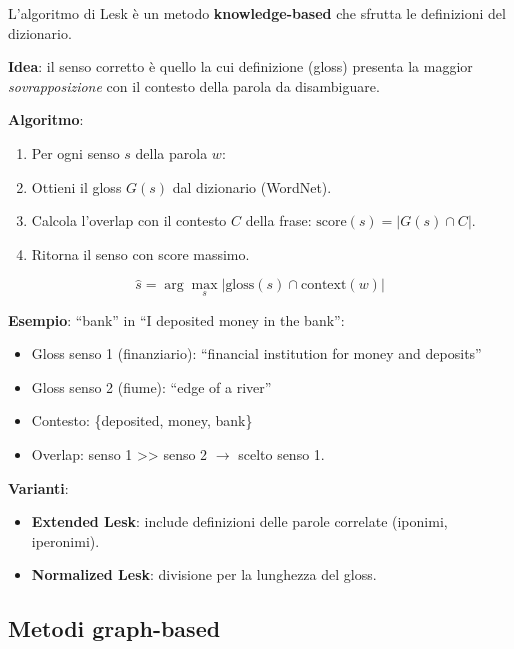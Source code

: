 \documentclass[12pt,a4paper]{article}
\begin{document}
L'algoritmo di Lesk è un metodo \textbf{knowledge-based} che sfrutta le definizioni del dizionario.

\begin{defbox}
\textbf{Idea}: il senso corretto è quello la cui definizione (gloss) presenta la maggior \emph{sovrapposizione} con il contesto della parola da disambiguare.
\end{defbox}

\textbf{Algoritmo}:
\begin{enumerate}[leftmargin=1.5em, label=\arabic*.]
  \item Per ogni senso $s$ della parola $w$:
  \item Ottieni il gloss $G(s)$ dal dizionario (WordNet).
  \item Calcola l'overlap con il contesto $C$ della frase: $\text{score}(s) = |G(s) \cap C|$.
  \item Ritorna il senso con score massimo.
\end{enumerate}

\begin{formulabox}
\[
\hat{s} = \arg\max_{s} \bigl|\text{gloss}(s) \cap \text{context}(w)\bigr|
\]
\end{formulabox}

\textbf{Esempio}: ``bank'' in ``I deposited money in the bank'':
\begin{itemize}[leftmargin=1.5em, nosep]
  \item Gloss senso 1 (finanziario): ``financial institution for money and deposits''
  \item Gloss senso 2 (fiume): ``edge of a river''
  \item Contesto: \{deposited, money, bank\}
  \item Overlap: senso 1 >> senso 2 $\to$ scelto senso 1.
\end{itemize}

\textbf{Varianti}:
\begin{itemize}[leftmargin=1.5em, nosep]
  \item \textbf{Extended Lesk}: include definizioni delle parole correlate (iponimi, iperoni\-mi).
  \item \textbf{Normalized Lesk}: divisione per la lunghezza del gloss.
\end{itemize}

\subsection{Metodi graph-based}
\end{document}
